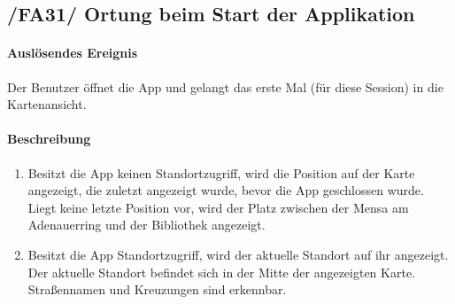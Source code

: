 \subsection*{/FA31/ Ortung beim Start der Applikation}
\label{/FA31/}
\paragraph{Auslösendes Ereignis}
Der Benutzer öffnet die App und gelangt das erste Mal (für diese Session) in die Kartenansicht.
\paragraph{Beschreibung}
\begin{enumerate}
    \item Besitzt die App keinen Standortzugriff, wird die Position auf der Karte angezeigt, die zuletzt angezeigt wurde, bevor die App geschlossen wurde. Liegt keine letzte Position vor, wird der Platz zwischen der Mensa am Adenauerring und der Bibliothek angezeigt.
    \item Besitzt die App Standortzugriff, wird der aktuelle Standort auf ihr angezeigt. Der aktuelle Standort befindet sich in der Mitte der angezeigten Karte. Straßennamen und Kreuzungen sind erkennbar.
\end{enumerate}
